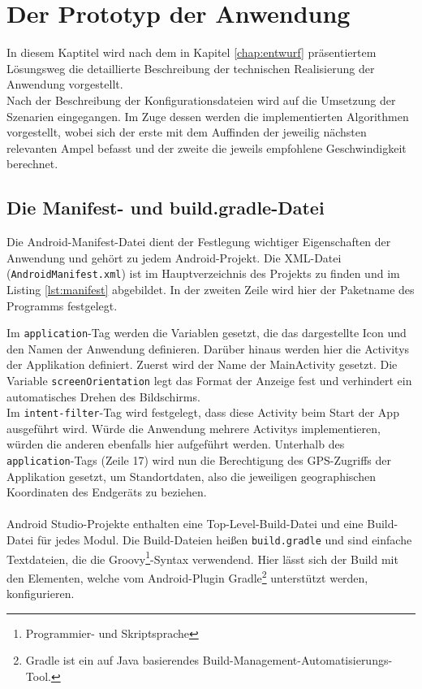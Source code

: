 \chapter{\label{chap:implementierung}Der Prototyp der Anwendung}
In diesem Kaptitel wird nach dem in Kapitel \ref{chap:entwurf} präsentiertem Lösungsweg die detaillierte Beschreibung der technischen Realisierung der Anwendung vorgestellt.\\
Nach der Beschreibung der Konfigurationsdateien wird auf die Umsetzung der Szenarien eingegangen. Im Zuge dessen werden die implementierten Algorithmen vorgestellt, wobei sich der erste mit dem Auffinden der jeweilig nächsten relevanten Ampel befasst und der zweite die jeweils empfohlene Geschwindigkeit berechnet.
%
%
\section{Die Manifest- und build.gradle-Datei}
Die Android-Manifest-Datei dient der Festlegung wichtiger Eigenschaften der Anwendung und gehört zu jedem Android-Projekt. Die \gls{XML}-Datei (\texttt{AndroidManifest.xml}) ist im Hauptverzeichnis des Projekts zu finden und im Listing \ref{lst:manifest} abgebildet. In der zweiten Zeile wird hier der Paketname des Programms festgelegt. 
\begin{center}
\grayRule 
\grayRule
\end{center}
Im \texttt{application}-Tag werden die Variablen gesetzt, die das dargestellte Icon und den Namen der Anwendung definieren. Darüber hinaus werden hier die \glspl{Activity} der Applikation definiert. Zuerst wird der Name der Main\gls{Activity} gesetzt. Die Variable \texttt{screenOrientation} legt das Format der Anzeige fest und verhindert ein automatisches Drehen des Bildschirms. \\
Im \texttt{intent-filter}-Tag wird festgelegt, dass diese Activity beim Start der App ausgeführt wird. Würde die Anwendung mehrere \glspl{Activity} implementieren, würden die anderen ebenfalls hier aufgeführt werden.
Unterhalb des \texttt{application}-Tags (Zeile 17) wird nun die Berechtigung des \gls{GPS}-Zugriffs der Applikation gesetzt, um Standortdaten, also die jeweiligen geographischen Koordinaten des Endgeräts zu beziehen.\\\\
Android Studio-Projekte enthalten eine Top-Level-Build-Datei und eine Build-Datei für jedes Modul. Die Build-Dateien heißen \texttt{build.gradle} und sind einfache Textdateien, die die Groovy\footnote{ Programmier- und Skriptsprache}-Syntax verwendend. Hier lässt sich der Build mit den Elementen, welche vom Android-Plugin Gradle\footnote{ Gradle ist ein auf Java basierendes Build-Management-Automatisierungs-Tool.} unterstützt werden, konfigurieren. \cite{android_build} \\ 
